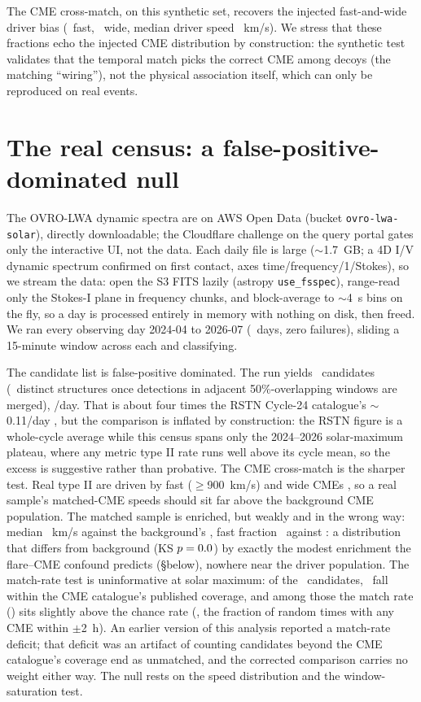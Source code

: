 \documentclass[twocolumn]{aastex631}
\newcommand{\code}[1]{\texttt{#1}}
\begin{document}
The CME cross-match, on this synthetic set, recovers the injected fast-and-wide driver bias
(\tiiSynFracFast\ fast, \tiiSynFracWide\ wide, median driver speed \tiiSynMedSpeed~km/s). We stress
that these fractions echo the injected CME distribution by construction: the synthetic test
validates that the temporal match picks the correct CME among decoys (the matching ``wiring''),
not the physical association itself, which can only be reproduced on real events.

\section{The real census: a false-positive-dominated null}
\label{sec:real}
The OVRO-LWA dynamic spectra are on AWS Open Data \citep{ovrolwa_data} (bucket
\code{ovro-lwa-solar}), directly downloadable; the Cloudflare challenge on the query portal
gates only the interactive UI, not the data. Each daily file is large ($\sim$1.7~GB; a 4D I/V
dynamic spectrum confirmed on first contact, axes time/frequency/1/Stokes), so we stream the data:
open the S3 FITS lazily (astropy \code{use\_fsspec}), range-read only the Stokes-I plane in
frequency chunks, and block-average to $\sim$4~s bins on the fly, so a day is processed entirely in
memory with nothing on disk, then freed. We ran every observing day 2024-04 to 2026-07
(\tiiRealNEvents\ days, zero failures), sliding a 15-minute window across each and classifying.

The candidate list is false-positive dominated. The run yields \tiiRealNTypeII\ candidates
(\tiiRealNDedup\ distinct structures once detections in adjacent 50\%-overlapping windows are
merged), \tiiRealDetRate/day. That is about four times the RSTN Cycle-24 catalogue's
$\sim$0.11/day \citep{lawrance2024}, but the comparison is inflated by construction: the RSTN
figure is a whole-cycle average while this census spans only the 2024--2026 solar-maximum
plateau, where any metric type II rate runs well above its cycle mean, so the excess is
suggestive rather than probative. The CME cross-match is the sharper test. Real type II are
driven by fast ($\ge$900~km/s) and wide CMEs \citep{gopalswamy2005}, so a real sample's
matched-CME speeds should sit far above the background CME population. The matched sample is
enriched, but weakly and in the wrong way: median \tiiRealMatchCmeMed~km/s against the
background's \tiiRealBgCmeMed, fast fraction \tiiRealMatchFracFast\ against
\tiiRealBgFracFast: a distribution that differs from background (KS
$p=0.0$) by exactly the modest enrichment the flare--CME confound predicts
(\S below), nowhere near the driver population. The match-rate test is uninformative at solar
maximum: of the \tiiRealNTypeII\ candidates, \tiiRealNCovered\ fall within the CME
catalogue's published coverage, and among those the match rate (\tiiRealObsMatch) sits slightly
above the chance rate (\tiiRealChanceMatch, the fraction of random times with any CME within
$\pm$2~h). An earlier version of this analysis reported a match-rate deficit; that deficit was
an artifact of counting candidates beyond the CME catalogue's coverage end as unmatched, and the
corrected comparison carries no weight either way. The null rests on the speed distribution and
the window-saturation test.
\end{document}
